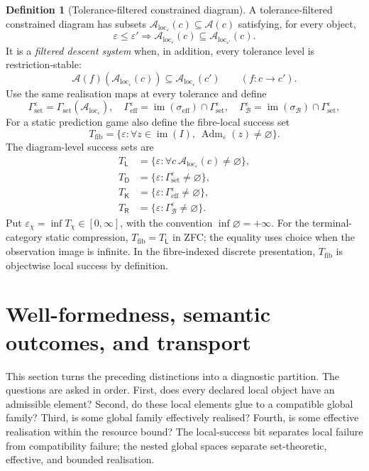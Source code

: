 \documentclass[11pt]{article}
\theoremstyle{plain}
\theoremstyle{definition}
\newtheorem{definition}[theorem]{Definition}
\theoremstyle{remark}
\newcommand{\im}{\operatorname{im}}
\newcommand{\Adm}{\operatorname{Adm}}
\newcommand{\LocalAdm}{\mathcal{A}_{\mathrm{loc}}}
\newcommand{\eps}{\varepsilon}
\begin{document}
\begin{definition}[Tolerance-filtered constrained diagram]\label{def:epsEC}
A tolerance-filtered constrained diagram has subsets
$\LocalAdm_\eps(c)\subseteq\mathcal A(c)$ satisfying, for every object,
\[
\eps\le\eps'
\Longrightarrow
\LocalAdm_\eps(c)\subseteq\LocalAdm_{\eps'}(c).
\]
It is a \emph{filtered descent system} when, in addition, every tolerance level
is restriction-stable:
\[
\mathcal A(f)(\LocalAdm_\eps(c))
\subseteq\LocalAdm_\eps(c')
\qquad(f:c\to c').
\]
Use the same realisation maps at every tolerance and define
\[
\Gamma_{\mathrm{set}}^\eps
=\Gamma_{\mathrm{set}}(\LocalAdm_\eps),\quad
\Gamma_{\mathrm{eff}}^\eps
=\im(\sigma_{\mathrm{eff}})\cap\Gamma_{\mathrm{set}}^\eps,
\quad
\Gamma_{\mathcal B}^\eps
=\im(\sigma_{\mathcal B})\cap\Gamma_{\mathrm{set}}^\eps,
\]
For a static prediction game also define the fibre-local success set
\[
T_{\mathrm{fib}}
=\{\eps:\forall z\in\im(I),\ \Adm_\eps(z)\ne\varnothing\}.
\]
The diagram-level success sets are
\begin{align*}
T_{\mathsf L}&=\{\eps:\forall c\ \LocalAdm_\eps(c)\ne\varnothing\},\\
T_{\mathsf D}&=\{\eps:\Gamma_{\mathrm{set}}^\eps\ne\varnothing\},\\
T_{\mathsf K}&=\{\eps:\Gamma_{\mathrm{eff}}^\eps\ne\varnothing\},\\
T_{\mathsf R}&=\{\eps:\Gamma_{\mathcal B}^\eps\ne\varnothing\}.
\end{align*}
Put $\eps_\chi=\inf T_\chi\in[0,\infty]$, with the convention
$\inf\varnothing=+\infty$.
For the terminal-category static compression, $T_{\mathrm{fib}}=T_{\mathsf L}$ in ZFC;
the equality uses choice when the observation image is infinite. In the
fibre-indexed discrete presentation, $T_{\mathrm{fib}}$ is objectwise local
success by definition.
\end{definition}

\section{Well-formedness, semantic outcomes, and transport}\label{sec:ladder}

This section turns the preceding distinctions into a diagnostic partition. The
questions are asked in order. First, does every declared local object have an
admissible element? Second, do these local elements glue to a compatible global
family? Third, is some global family effectively realised? Fourth, is some
effective realisation within the resource bound? The local-success bit separates
local failure from compatibility failure; the nested global spaces separate
set-theoretic, effective, and bounded realisation.
\end{document}
